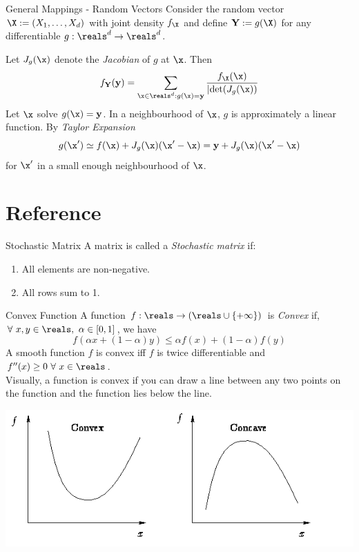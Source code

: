 \documentclass[11pt,a4paper]{article}
\begin{document}
\begin{proposition}{General Mappings - Random Vectors}
  Consider the random vector $\X:=(X_1,\dots,X_d)$ with joint density $f_\X$ and define $\mathbf{Y}:=g(\X)$ for any differentiable $g:\reals^d\to\reals^d$.
  \par Let $J_g(\x)$ denote the \textit{Jacobian} of $g$ at $\x$. Then
  \[ f_\mathbf{Y}(\mathbf{y})=\sum_{\x\in\reals^d:g(\x)=\mathbf{y}}\frac{f_\X(\x)}{|\text{det}(J_g(\x))} \]
  Let $\x$ solve $g(\x)=\mathbf{y}$. In a neighbourhood of $\x$, $g$ is approximately a linear function. By \textit{Taylor Expansion}
  \[ g(\x')\simeq f(\x)+J_g(\x)(\x'-\x)=\mathbf{y}+J_g(\x)(\x'-\x) \]
  for $\x'$ in a small enough neighbourhood of $\x$.
\end{proposition}

\newpage
\setcounter{section}{-1}
\section{Reference}

\begin{definition}{Stochastic Matrix}
  A matrix is called a \textit{Stochastic matrix} if:
  \begin{enumerate}
    \item All elements are non-negative.
    \item All rows sum to 1.
  \end{enumerate}
\end{definition}

\begin{definition}{Convex Function}
  A function $f:\reals\to(\reals\cup\{+\infty\})$ is \textit{Convex} if, $\forall\ x,y\in\reals,\ \alpha\in[0,1]$, we have
  \[ f(\alpha x+(1-\alpha)y)\leq\alpha f(x)+(1-\alpha)f(y) \]
  A smooth function $f$ is convex iff $f$ is twice differentiable and $f''(x)\geq0\ \forall\ x\in\reals$.\\
  Visually, a function is convex if you can draw a line between any two points on the function and the function lies below the line.
  \begin{center}
    \includegraphics[scale=.5]{convex_concave.png}
  \end{center}
\end{definition}
\end{document}
